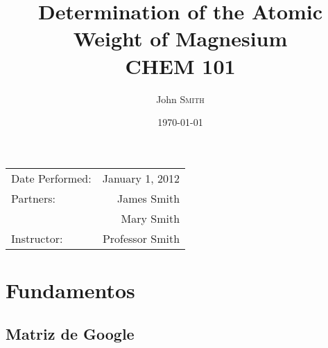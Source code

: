 \documentclass{article}
\title{Determination of the Atomic \\ Weight of Magnesium \\ CHEM 101} %
\author{John \textsc{Smith}} %
\date{\today} %
\begin{document}
\maketitle %

\begin{center}
\begin{tabular}{l r}
Date Performed: & January 1, 2012 \\ %
Partners: & James Smith \\ %
& Mary Smith \\
Instructor: & Professor Smith %
\end{tabular}
\end{center}



\section{Fundamentos}



\subsection{Matriz de Google}
\label{definitions}
\end{document}
